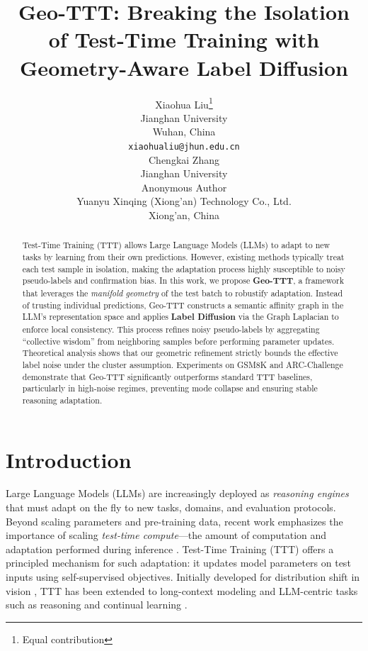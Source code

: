 \documentclass{article}
\title{Geo-TTT: Breaking the Isolation of Test-Time Training with \\ Geometry-Aware Label Diffusion}
\author{%
  Xiaohua Liu\thanks{Equal contribution} \\
  Jianghan University \\
  Wuhan, China \\
  \texttt{xiaohualiu@jhun.edu.cn} \\
  \And
  Chengkai Zhang\footnotemark[1] \\
  Jianghan University \\
  \And
  Anonymous Author \\
  Yuanyu Xinqing (Xiong'an) Technology Co., Ltd. \\
  Xiong'an, China \\
}
\date{}
\theoremstyle{plain}
\theoremstyle{definition}
\theoremstyle{remark}
\begin{document}
\maketitle

\begin{abstract}
Test-Time Training (TTT) allows Large Language Models (LLMs) to adapt to new tasks by learning from their own predictions. However, existing methods typically treat each test sample in isolation, making the adaptation process highly susceptible to noisy pseudo-labels and confirmation bias. In this work, we propose \textbf{Geo-TTT}, a framework that leverages the \textit{manifold geometry} of the test batch to robustify adaptation. Instead of trusting individual predictions, Geo-TTT constructs a semantic affinity graph in the LLM's representation space and applies \textbf{Label Diffusion} via the Graph Laplacian to enforce local consistency. This process refines noisy pseudo-labels by aggregating ``collective wisdom'' from neighboring samples before performing parameter updates. Theoretical analysis shows that our geometric refinement strictly bounds the effective label noise under the cluster assumption. Experiments on GSM8K and ARC-Challenge demonstrate that Geo-TTT significantly outperforms standard TTT baselines, particularly in high-noise regimes, preventing mode collapse and ensuring stable reasoning adaptation.
\end{abstract}
\section{Introduction}
\label{sec:intro}

Large Language Models (LLMs) are increasingly deployed as \emph{reasoning engines} that must adapt on the fly to new tasks, domains, and evaluation protocols. Beyond scaling parameters and pre-training data, recent work emphasizes the importance of scaling \emph{test-time compute}---the amount of computation and adaptation performed during inference \cite{snell2024scaling, ttcsurvey2025, ttcompute2025, deepseek2025}. Test-Time Training (TTT) offers a principled mechanism for such adaptation: it updates model parameters on test inputs using self-supervised objectives. Initially developed for distribution shift in vision \cite{sun2020ttt, wang2021tent, mummadi2021tta, zhang2024surveytta}, TTT has been extended to long-context modeling and LLM-centric tasks such as reasoning and continual learning \cite{sun2023learning, templora2024, templora2025emotion, tlm2025, inplacettt2025, llmttt2024mm}.
\end{document}
